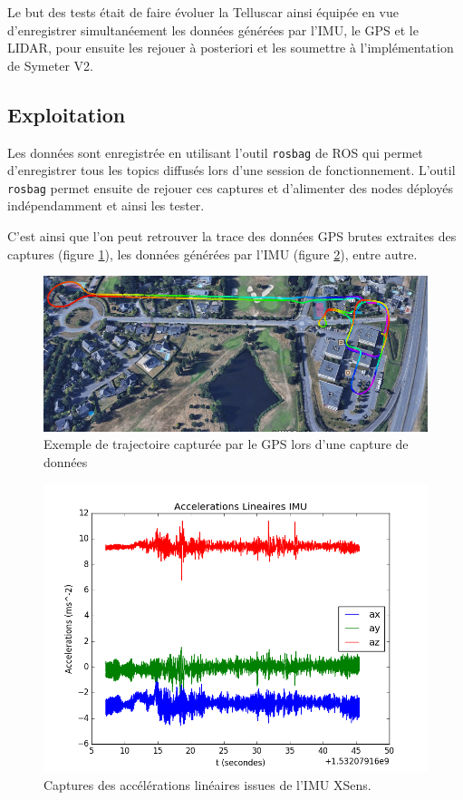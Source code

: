 \documentclass[12pt,a4paper]{report}
\begin{document}
	\para Le but des tests était de faire évoluer la Telluscar ainsi équipée en vue d'enregistrer simultanéement les données générées par l'IMU, le GPS et le LIDAR, pour ensuite les rejouer à posteriori et les soumettre à l'implémentation de Symeter V2.
	
	\subsection{Exploitation}
	\para Les données sont enregistrée en utilisant l'outil \verb|rosbag| de ROS qui permet d'enregistrer tous les topics diffusés lors d'une session de fonctionnement. L'outil \verb|rosbag| permet ensuite de rejouer ces captures et d'alimenter des nodes déployés indépendamment et ainsi les tester.
	
	\para C'est ainsi que l'on peut retrouver la trace des données GPS brutes extraites des captures (figure \ref{fig:trajectoire}), les données générées par l'IMU (figure \ref{fig:imelinacctine}), entre autre.
\begin{figure}[h!]
	\centering
	\includegraphics[width=1\linewidth]{img/trajectoire}
	\caption[trajectoire]{Exemple de trajectoire capturée par le GPS lors d'une capture de données}
	\label{fig:trajectoire}
\end{figure}


\begin{figure}[h!]
	\centering
	\includegraphics[width=0.7\linewidth]{img/imeLinAccTine}
	\caption[acclin]{Captures des accélérations linéaires issues de l'IMU XSens.}
	\label{fig:imelinacctine}
\end{figure}
\end{document}
